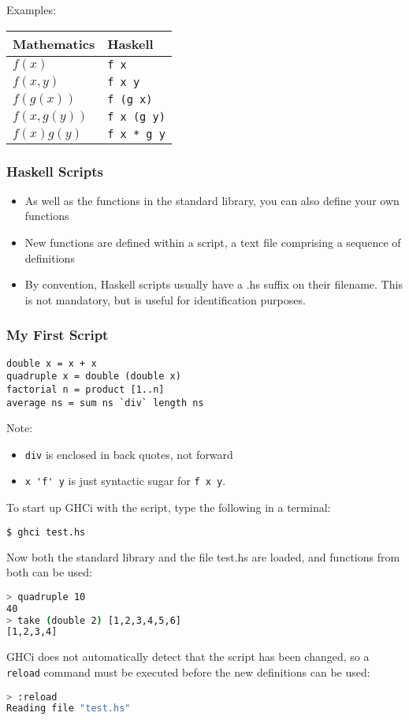 \begin{multicols}{2}
Examples:\\
\begin{tabularx}{\linewidth}{|X|X|}
\hline
\textbf{Mathematics} & \textbf{Haskell} \\
\hline
$f(x)$ & \lstinline|f x| \\
$f(x,y)$ & \lstinline|f x y| \\
$f(g(x))$ & \lstinline|f (g x)| \\
$f(x,g(y))$ & \lstinline|f x (g y)| \\
$f(x)g(y)$ & \lstinline|f x * g y| \\
\hline
\end{tabularx}

\subsubsection{Haskell Scripts}
\begin{itemize}
  \item As well as the functions in the standard library, you can also define your own functions
  \item New functions are defined within a script, a text file comprising a sequence of definitions
  \item By convention, Haskell scripts usually have a .hs suffix on their filename. This is not mandatory, but is useful for identification purposes.
\end{itemize}

\subsubsection{My First Script}
\begin{lstlisting}[multicols=2]
double x = x + x
quadruple x = double (double x)
factorial n = product [1..n]
average ns = sum ns `div` length ns
\end{lstlisting}
Note:
\begin{itemize}
  \item \lstinline{div} is enclosed in back quotes, not forward
  \item \lstinline{x 'f' y} is just syntactic sugar for \lstinline{f x y}.
\end{itemize}

To start up GHCi with the script, type the following in a terminal:
\begin{lstlisting}[language=bash]
$ ghci test.hs
\end{lstlisting}
Now both the standard library and the file test.hs are loaded, and functions from both can be used:
\begin{lstlisting}[language=bash]
> quadruple 10
40
> take (double 2) [1,2,3,4,5,6]
[1,2,3,4]
\end{lstlisting}
GHCi does not automatically detect that the script has been changed, so a \lstinline[language=bash]{reload} command must be executed before the new definitions can be used:
\begin{lstlisting}[language=bash]
> :reload
Reading file "test.hs"
\end{lstlisting}


\end{multicols}
